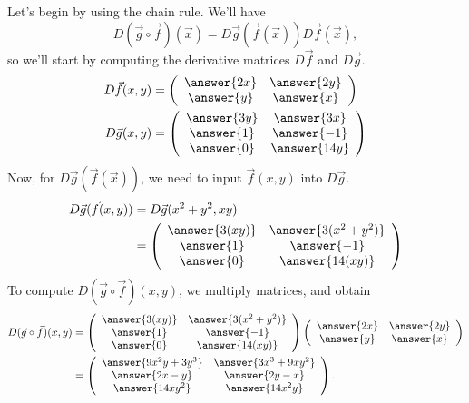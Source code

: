 \documentclass{ximera}
\begin{document}
\begin{example}
Let's begin by using the chain rule. We'll have 
\[
 D(\vec{g}\circ\vec{f})(\vec{x}) = D\vec{g}(\vec{f}(\vec{x}))D\vec{f}(\vec{x}),
\]
so we'll start by computing the derivative matrices $D\vec{f}$ and $D\vec{g}$.
\begin{align*}
D\vec{f}(x,y) &= \left(\begin{array}{cc}\answer{2x} & \answer{2y}\\\answer{y} & \answer{x}\end{array}\right)\\
D\vec{g}(x,y) &= \left(\begin{array}{cc}\answer{3y} & \answer{3x}\\\answer{1} & \answer{-1}\\\answer{0} & \answer{14y}\end{array}\right)
\end{align*}
Now, for $D\vec{g}(\vec{f}(\vec{x}))$, we need to input $\vec{f}(x,y)$ into $D\vec{g}$.
\begin{align*}
D\vec{g}(\vec{f}(x,y)) &= D\vec{g}(x^2+y^2, xy)\\
&= \left(\begin{array}{cc}\answer{3(xy)} & \answer{3(x^2+y^2)}\\\answer{1} & \answer{-1}\\\answer{0} & \answer{14(xy)}\end{array}\right)
\end{align*}
To compute $ D(\vec{g}\circ\vec{f})(x,y)$, we multiply matrices, and obtain
\begin{align*}
D(\vec{g}\circ\vec{f})(x,y) &=  \left(\begin{array}{cc}\answer{3(xy)} & \answer{3(x^2+y^2)}\\\answer{1} & \answer{-1}\\\answer{0} & \answer{14(xy)}\end{array}\right)\left(\begin{array}{cc}\answer{2x} & \answer{2y}\\\answer{y} & \answer{x}\end{array}\right)\\
&= \left(\begin{array}{cc}\answer{9x^2y+3y^3} & \answer{3x^3+9xy^2}\\\answer{2x-y} & \answer{2y-x}\\\answer{14xy^2} & \answer{14x^2y}\end{array}\right).
\end{align*}


\end{example}
\end{document}
